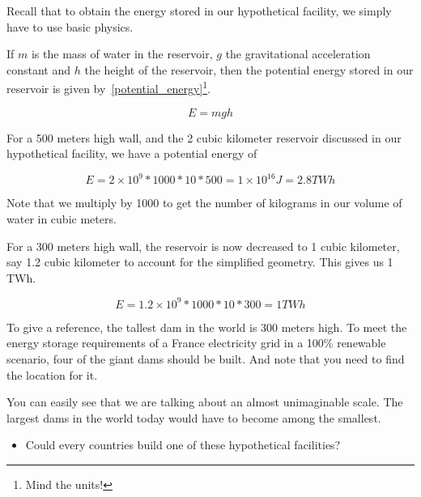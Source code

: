 \begin{remark}
Recall that to obtain the energy stored in our hypothetical facility, we simply have to use basic physics.

If $m$ is the mass of water in the reservoir, $g$ the gravitational acceleration constant and $h$ the height of the reservoir, then the potential energy stored in our reservoir is given by~\ref{potential_energy}\footnote{Mind the units!}.

\begin{equation}\label{potential_energy}
E = mgh
\end{equation}

For a 500 meters high wall, and the 2 cubic kilometer reservoir discussed in our hypothetical facility, we have a potential energy of

\begin{equation}\label{potential_energy}
E = 2 \times 10^9 * 1000 * 10 * 500 = 1 \times 10^{16} J = 2.8 TWh
\end{equation}

Note that we multiply by 1000 to get the number of kilograms in our volume of water in cubic meters.

For a 300 meters high wall, the reservoir is now decreased to 1 cubic kilometer, say 1.2 cubic kilometer to account for the simplified geometry. This gives us 1 TWh.

\begin{equation}\label{potential_energy}
E = 1.2 \times 10^9 * 1000 * 10 * 300 = 1 TWh
\end{equation}

\end{remark}

To give a reference, the tallest dam in the world is 300 meters high. To meet the energy storage requirements of a France electricity grid in a 100\% renewable scenario, four of the giant dams should be built. And note that you need to find the location for it.

You can easily see that we are talking about an almost unimaginable scale. The largest dams in the world today would have to become among the smallest.

\begin{itemize}
\item Could every countries build one of these hypothetical facilities?
\end{itemize}

